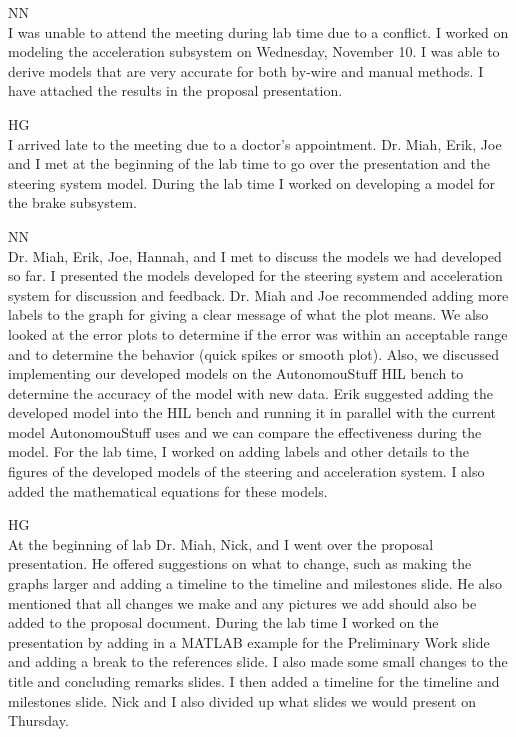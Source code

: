 \documentclass[fontsize=11pt, %
                             paper=letter, %
                             openany, %
                             captions=tableheading,
                             index=totoc,
                             hyperref]{labbook}
\def\currentYear{2021}
\begin{document}
\begin{addmargin}[0cm]{0cm}
NN\\
I was unable to attend the meeting during lab time due to a conflict. I worked on modeling the acceleration subsystem on Wednesday, November 10. I was able to derive models that are very accurate for both by-wire and manual methods. I have attached the results in the proposal presentation.


\labday{Thursday, November 11, \currentYear}
HG\\
I arrived late to the meeting due to a doctor's appointment. Dr. Miah, Erik, Joe and I met at the beginning of the lab time to go over the presentation and the steering system model. During the lab time I worked on developing a model for the brake subsystem.  

NN\\
Dr. Miah, Erik, Joe, Hannah, and I met to discuss the models we had developed so far. I presented the models developed for the steering system and acceleration system for discussion and feedback. Dr. Miah and Joe recommended adding more labels to the graph for giving a clear message of what the plot means. We also looked at the error plots to determine if the error was within an acceptable range and to determine the behavior (quick spikes or smooth plot). Also, we discussed implementing our developed models on the AutonomouStuff HIL bench to determine the accuracy of the model with new data. Erik suggested adding the developed model into the HIL bench and running it in parallel with the current model AutonomouStuff uses and we can compare the effectiveness during the model. For the lab time, I worked on adding labels and other details to the figures of the developed models of the steering and acceleration system. I also added the mathematical equations for these models.


\labday{Tuesday, November 16, \currentYear}
HG\\
At the beginning of lab Dr. Miah, Nick, and I went over the proposal presentation. He offered suggestions on what to change, such as making the graphs larger and adding a timeline to the timeline and milestones slide. He also mentioned that all changes we make and any pictures we add should also be added to the proposal document. During the lab time I worked on the presentation by adding in a MATLAB example for the Preliminary Work slide and adding a break to the references slide. I also made some small changes to the title and concluding remarks slides. I then added a timeline for the timeline and milestones slide. Nick and I also divided up what slides we would present on Thursday. 


\end{addmargin}
\end{document}
